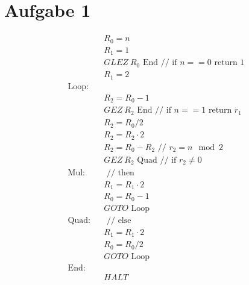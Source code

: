




\newcommand{\nr}{2}


\section*{Aufgabe 1}
\begin{eqnarray}
&& R_0 = n\\
&& R_1 = 1\\
&& GLEZ\ R_0 \text{ End} \text{ // if $n==0$ return 1}\\
&& R_1 = 2\\
\text{Loop:}&&\\
    && R_2 = R_0 - 1\\
    && GEZ\ R_2 \text{ End} \text{ // if $n==1$ return $r_1$}\\
    && R_2 = R_0 / 2 \\
    && R_2 = R_2 \cdot 2 \\
    && R_2 = R_0 - R_2 \text{ // $r_2 = n \mod 2$}\\
    && GEZ\ R_2 \text{ Quad} \text{ // if $r_2 \neq 0$ }\\
\text{Mul:}&& \text{ // then }\\
    && R_1 = R_1 \cdot 2\\
    && R_0 = R_0 - 1 \\
    && GOTO \text{ Loop}\\
\text{Quad:}&& \text{ // else }\\
    && R_1 = R_1 \cdot 2\\
    && R_0 = R_0 / 2\\
    && GOTO \text{ Loop}\\
\text{End:}&&\\
&& HALT
\end{eqnarray}

